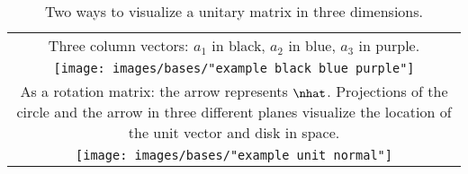 \begin{table}[ht]
\caption[Two ways to visualize a unitary matrix in three dimensions]{Two ways to visualize a unitary matrix in three dimensions.}
\begin{center}
\begin{tabular}{c}
%
 Three column vectors: $a_{1}$ in black, $a_{2}$ in blue, $a_{3}$ in purple. \\
%
  \texttt{[image: images/bases/"example black blue purple"]} \\[20pt]
%
 As a rotation matrix: the arrow represents $\nhat$. Projections of the circle and the arrow in three different planes visualize the location of the unit vector and disk in space.  \\
%
  \texttt{[image: images/bases/"example unit normal"]} \\
%
\end{tabular}
\end{center}
\label{tab:visual:3d}
\end{table}%

\endinput